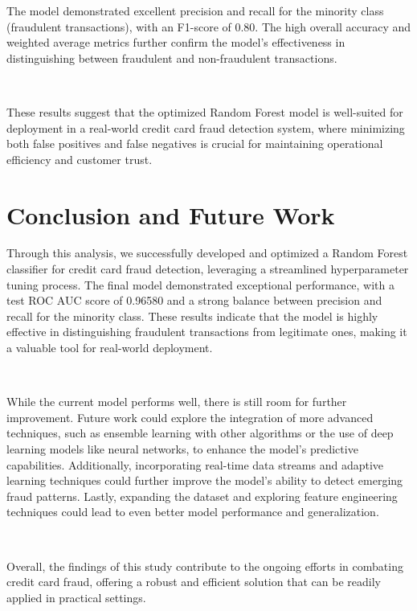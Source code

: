 \documentclass{article}
\begin{document}
\noindent
The model demonstrated excellent precision and recall for the minority class (fraudulent transactions), with an F1-score of 0.80. The high overall accuracy and weighted average metrics further confirm the model's effectiveness in distinguishing between fraudulent and non-fraudulent transactions.

\

\noindent
These results suggest that the optimized Random Forest model is well-suited for deployment in a real-world credit card fraud detection system, where minimizing both false positives and false negatives is crucial for maintaining operational efficiency and customer trust.


\section{Conclusion and Future Work}

Through this analysis, we successfully developed and optimized a Random Forest classifier for credit card fraud detection, leveraging a streamlined hyperparameter tuning process. The final model demonstrated exceptional performance, with a test ROC AUC score of 0.96580 and a strong balance between precision and recall for the minority class. These results indicate that the model is highly effective in distinguishing fraudulent transactions from legitimate ones, making it a valuable tool for real-world deployment.

\

\noindent
While the current model performs well, there is still room for further improvement. Future work could explore the integration of more advanced techniques, such as ensemble learning with other algorithms or the use of deep learning models like neural networks, to enhance the model's predictive capabilities. Additionally, incorporating real-time data streams and adaptive learning techniques could further improve the model's ability to detect emerging fraud patterns. Lastly, expanding the dataset and exploring feature engineering techniques could lead to even better model performance and generalization.

\

\noindent
Overall, the findings of this study contribute to the ongoing efforts in combating credit card fraud, offering a robust and efficient solution that can be readily applied in practical settings.
\end{document}
